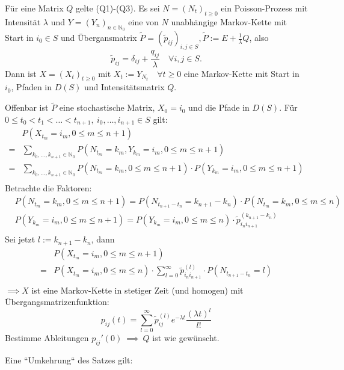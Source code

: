 \documentclass[a4paper,twoside,DIV15,BCOR12mm]{scrbook}
\begin{document}
  \begin{satz}
    \label{Satz 8.4}
    Für eine Matrix $Q$ gelte (Q1)-(Q3). Es sei $N=(N_t)_{t\geq0}$ ein Poisson-Prozess mit
    Intensität $\lambda$ und $Y=(Y_n)_{n\in\mathbb N_0}$ eine von $N$ unabhängige Markov-Kette
    mit Start in $i_0\in S$ und Übergansmatrix $\tilde{P}=(\tilde{p}_{ij})_{i,j\in S},
    \tilde{P}:=E+\frac{1}{\lambda}Q$, also
    \[
    \tilde{p}_{ij}=\delta_{ij}+\frac{q_{ij}}{\lambda} \quad \forall i,j\in S.
    \]
    Dann ist $X=(X_t)_{t\geq0}$ mit $X_t:=Y_{N_t} \quad\forall t\geq0$ eine Markov-Kette
    mit Start in $i_0$, Pfaden in $D(S)$ und Intensitätsmatrix $Q$.
  \end{satz}
  \begin{beweis}
    Offenbar ist $\tilde{P}$ eine stochastische Matrix, $X_0=i_0$ und die Pfade in $D(S)$.
    Für $0\leq t_0<t_1<\dots<t_{n+1}, \ i_0,\dots,i_{n+1}\in S$ gilt:
    \begin{align*}
      & P(X_{t_m}=i_m,0\leq m\leq n+1) \\
      =& \sum_{k_0,\dots,k_{n+1}\in\mathbb N_0} P(N_{t_m}=k_m, Y_{k_m}=i_m, 0\leq m\leq n+1) \\
      =& \sum_{k_0,\dots,k_{n+1}\in\mathbb N_0} P(N_{t_m}=k_m, 0\leq m\leq n+1)\cdot P(Y_{k_m}=i_m, 0\leq m\leq n+1) \\
    \end{align*}
    Betrachte die Faktoren:
    \begin{align*}
      & P(N_{t_m}=k_m, 0\leq m\leq n+1)=P(N_{t_{n+1}-t_n}=k_{n+1}-k_n)\cdot P(N_{t_m}=k_m, 0\leq m \leq n) \\
      & P(Y_{k_m}=i_m, 0\leq m \leq n+1) = P(Y_{k_m}=i_m, 0\leq m \leq n) \cdot \tilde{p}_{i_ni_{n+1}}^{(k_{n+1}-k_n)} \\
    \end{align*}
    Sei jetzt $l:=k_{n+1}-k_n$, dann
    \begin{align*}
      & P(X_{t_m}=i_m, 0\leq m \leq n+1) \\ 
      =& P(X_{t_m}=i_m, 0\leq m \leq n)\cdot \sum_{l=0}^\infty \tilde{p}_{i_ni_{n+1}}^{(l)} \cdot P(N_{t_{n+1}-t_n}=l) \\
    \end{align*}
    $\implies X$ ist eine Markov-Kette in stetiger Zeit (und homogen) mit Übergangsmatrizenfunktion:
    \[
    p_{ij}(t)=\sum_{l=0}^\infty\tilde{p}_{ij}^{(l)}e^{-\lambda t} \frac{(\lambda t)^l}{l!}
    \]
    Bestimme Ableitungen $p_{ij}'(0) \ \implies \ Q$ ist wie gewünscht.
  \end{beweis}
  Eine ``Umkehrung`` des Satzes gilt: \\
\end{document}
